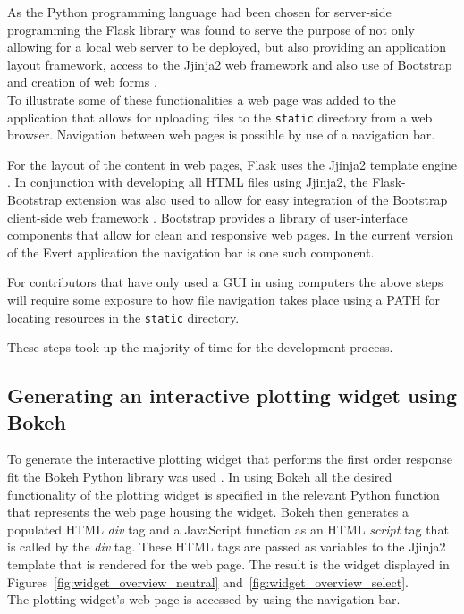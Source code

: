 \documentclass[a4paper,12pt]{article}
\begin{document}
As the Python programming language had been chosen for server-side programming the Flask library was found to serve the purpose of not only allowing for a local web server to be deployed, but also providing an application layout framework, access to the Jjinja2 web framework and also use of Bootstrap and creation of web forms \citep{flask}.\\To illustrate some of these functionalities a web page was added to the application that allows for uploading files to the \texttt{static} directory from a web browser. Navigation between web pages is possible by use of a navigation bar.

For the layout of the content in web pages, Flask uses the Jjinja2 template engine \citep{jjinja2}. In conjunction with developing all HTML files using Jjinja2, the Flask-Bootstrap extension was also used to allow for easy integration of the Bootstrap client-side web framework \citep{grinberg}. Bootstrap provides a library of user-interface components that allow for clean and responsive web pages. In the current version of the Evert application the navigation bar is one such component.

For contributors that have only used a GUI in using computers the above steps will require some exposure to how file navigation takes place using a PATH for locating resources in the \texttt{static} directory.

These steps took up the majority of time for the development process.

\subsection{Generating an interactive plotting widget using Bokeh}
To generate the interactive plotting widget that performs the first order response fit the Bokeh Python library was used \citep{bokeh}. In using Bokeh all the desired functionality of the plotting widget is specified in the relevant Python function that represents the web page housing the widget. Bokeh then generates a populated HTML \emph{div} tag and a JavaScript function as an HTML \emph{script} tag that is called by the \emph{div} tag. These HTML tags are passed as variables to the Jjinja2 template that is rendered for the web page. The result is the widget displayed in  Figures~\ref{fig:widget_overview_neutral} and~\ref{fig:widget_overview_select}.\\The plotting widget's web page is accessed by using the navigation bar.
\end{document}
